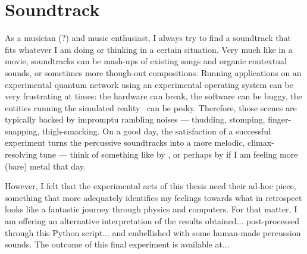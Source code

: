 \chapter{Soundtrack}
\label{app:soundtrack}

\begin{refsection}


As a musician (?) and music enthusiast, I always try to find a soundtrack that fits whatever I am
doing or thinking in a certain situation. Very much like in a movie, soundtracks can be mash-ups of
existing songs and organic contextual sounds, or sometimes more though-out compositions. Running
applications on an experimental quantum network using an experimental operating system can be very
frustrating at times: the hardware can break, the software can be buggy, the entities running the
simulated reality~\cite{bostrom_simulation_2003} can be pesky. Therefore, those scenes are typically
backed by impromptu rambling noises --- thudding, stomping, finger-snapping, thigh-smacking. On a
good day, the satisfaction of a successful experiment turns the percussive soundtracks into a more
melodic, climax-resolving tune --- think of something like  by
\textcite{gorillaz_feelgoodinc}, or perhaps  by \textcite{tool_lateralus}
if I am feeling more (bare) metal that day.

However, I felt that the experimental acts of this thesis need their ad-hoc piece, something that
more adequately identifies my feelings towards what in retrospect looks like a fantastic journey
through physics and computers. For that matter, I am offering an alternative interpretation of the
results obtained... post-processed through this Python script... and embellished with some
human-made percussion sounds. The outcome of this final experiment is available at...

\printbibliography[heading=subbibintoc,title={References}]

\end{refsection}
